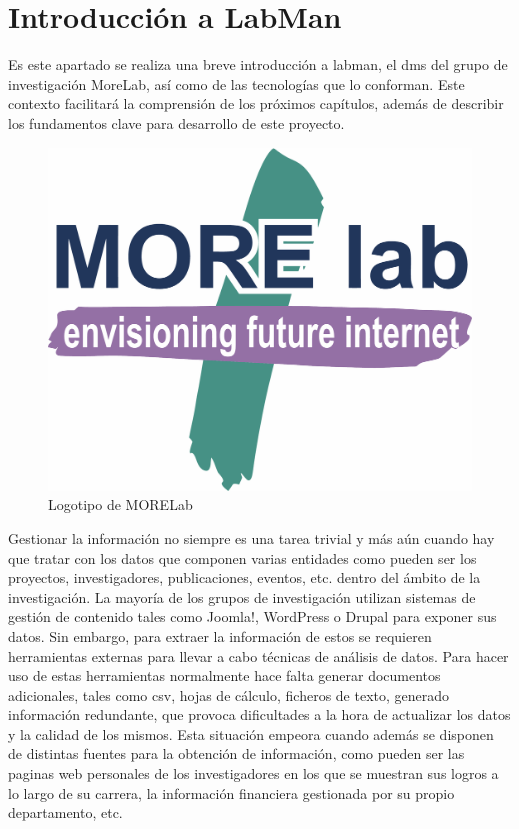 \section{Introducción a LabMan}

Es este apartado se realiza una breve introducción a \acrfull{labman}, el \acrlong{dms} del grupo de investigación MoreLab, así como de las tecnologías que lo conforman. Este contexto facilitará la comprensión de los próximos capítulos, además de describir los fundamentos clave para desarrollo de este proyecto.

\begin{figure}[!htp]
	\centering
	\includegraphics[scale=0.15]{fig/morelab-logo}
	\caption{Logotipo de MORELab}
\end{figure}

Gestionar la información no siempre es una tarea trivial y más aún cuando hay que tratar con los datos que componen varias entidades como pueden ser los proyectos, investigadores, publicaciones, eventos, etc. dentro del ámbito de la investigación. La mayoría de los grupos de investigación utilizan sistemas de gestión de contenido tales como Joomla!\cite{joomla}, WordPress\cite{wordpress} o Drupal\cite{drupal} para exponer sus datos. Sin embargo, para extraer la información de estos  se requieren herramientas externas para llevar a cabo técnicas de análisis de datos. 
Para hacer uso de estas herramientas normalmente hace falta generar documentos adicionales, tales como \acrshort{csv}, hojas de cálculo, ficheros de texto, generado información redundante, que provoca dificultades a la hora de actualizar los datos y la calidad de los mismos. Esta situación empeora cuando además se disponen de distintas fuentes para la obtención de información, como pueden ser las paginas web personales de los investigadores en los que se muestran sus logros a lo largo de su carrera, la información financiera gestionada por su propio departamento, etc.

